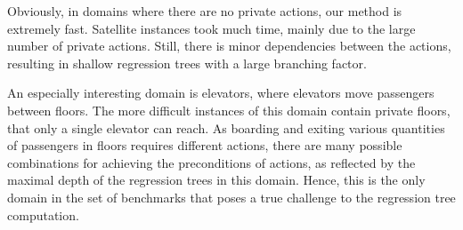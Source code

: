 \documentclass[letterpaper]{article}
\theoremstyle{definition}
\begin{document}
Obviously, in domains where there are no private actions, our method is extremely fast. 
Satellite instances took much time, mainly due to the large number of private actions. Still, there is minor dependencies between the actions, resulting in shallow regression trees with a large branching factor.

\begin{table}[t!]
\centering
\footnotesize
{}
\caption{Projection computation metrics over a large problem from each domain.}
\label{tbl:projection}
\end{table}


An especially interesting domain is elevators, where elevators move passengers between floors. The more difficult instances of this domain contain private floors, that only a single elevator can reach. As boarding and exiting various quantities of passengers in floors requires different actions,  there are many possible combinations for achieving the preconditions of actions, as reflected by the maximal depth of the regression trees in this domain. Hence, this is the only domain in the set of benchmarks that poses a true challenge to the regression tree computation.
\end{document}
